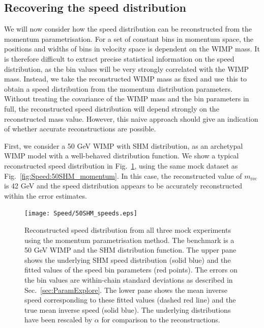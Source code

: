 \subsection{Recovering the speed distribution}

We will now consider how the speed distribution can be reconstructed from the momentum parametrisation. For a set of constant bins in momentum space, the positions and widths of bins in velocity space is dependent on the WIMP mass. It is therefore difficult to extract precise statistical information on the speed distribution, as the bin values will be very strongly correlated with the WIMP mass. Instead, we take the reconstructed WIMP mass as fixed and use this to obtain a speed distribution from the momentum distribution parameters. Without treating the covariance of the WIMP mass and the bin parameters in full, the reconstructed speed distribution will depend strongly on the reconstructed mass value. However, this naive approach should give an indication of whether accurate reconstructions are possible.

First, we consider a 50 GeV WIMP with SHM distribution, as an archetypal WIMP model with a well-behaved distribution function. We show a typical reconstructed speed distribution in Fig.\ \ref{fig:Speed:SHM50}, using the same mock dataset as Fig.\ \ref{fig:Speed:50SHM_momentum}. In this case, the reconstructed value of \(m_\textrm{rec}\) is 42 GeV and the speed distribution appears to be accurately reconstructed within the error estimates. 

 \begin{figure}[t]
\centering
\texttt{[image: Speed/50SHM\_speeds.eps]}
\caption[Reconstructed speed distribution from all three mock experiments using the momentum parametrisation method for a 50 GeV WIMP and SHM distribution function.]{Reconstructed speed distribution from all three mock experiments using the momentum parametrisation method. The benchmark is a 50 GeV WIMP and the SHM distribution function. The upper pane shows the underlying SHM speed distribution (solid blue) and the fitted values of the speed bin parameters (red points). The errors on the bin values are within-chain standard deviations as described in Sec.\ \ref{sec:ParamExplore}. The lower pane shows the mean inverse speed corresponding to these fitted values (dashed red line) and the true mean inverse speed (solid blue). The underlying distributions have been rescaled by \(\alpha\) for comparison to the reconstructions.}
  \label{fig:Speed:SHM50}
\end{figure}

